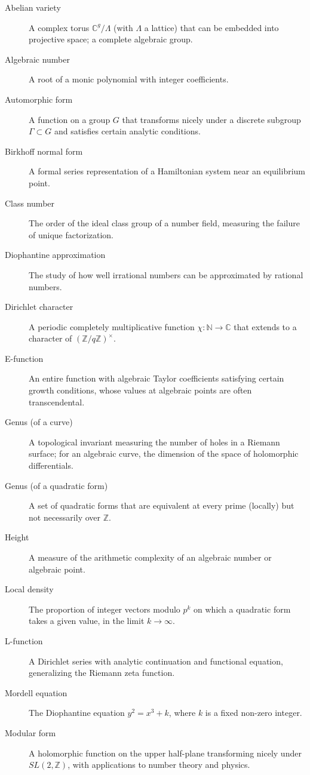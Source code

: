 \begin{description}
    \item[Abelian variety] A complex torus $\mathbb{C}^g / \Lambda$ (with $\Lambda$ a lattice) that can be embedded into projective space; a complete algebraic group.
    \item[Algebraic number] A root of a monic polynomial with integer coefficients.
    \item[Automorphic form] A function on a group $G$ that transforms nicely under a discrete subgroup $\Gamma \subset G$ and satisfies certain analytic conditions.
    \item[Birkhoff normal form] A formal series representation of a Hamiltonian system near an equilibrium point.
    \item[Class number] The order of the ideal class group of a number field, measuring the failure of unique factorization.
    \item[Diophantine approximation] The study of how well irrational numbers can be approximated by rational numbers.
    \item[Dirichlet character] A periodic completely multiplicative function $\chi: \mathbb{N} \to \mathbb{C}$ that extends to a character of $(\mathbb{Z}/q\mathbb{Z})^\times$.
    \item[E-function] An entire function with algebraic Taylor coefficients satisfying certain growth conditions, whose values at algebraic points are often transcendental.
    \item[Genus (of a curve)] A topological invariant measuring the number of holes in a Riemann surface; for an algebraic curve, the dimension of the space of holomorphic differentials.
    \item[Genus (of a quadratic form)] A set of quadratic forms that are equivalent at every prime (locally) but not necessarily over $\mathbb{Z}$.
    \item[Height] A measure of the arithmetic complexity of an algebraic number or algebraic point.
    \item[Local density] The proportion of integer vectors modulo $p^k$ on which a quadratic form takes a given value, in the limit $k \to \infty$.
    \item[L-function] A Dirichlet series with analytic continuation and functional equation, generalizing the Riemann zeta function.
    \item[Mordell equation] The Diophantine equation $y^2 = x^3 + k$, where $k$ is a fixed non-zero integer.
    \item[Modular form] A holomorphic function on the upper half-plane transforming nicely under $SL(2,\mathbb{Z})$, with applications to number theory and physics.

\end{description}
